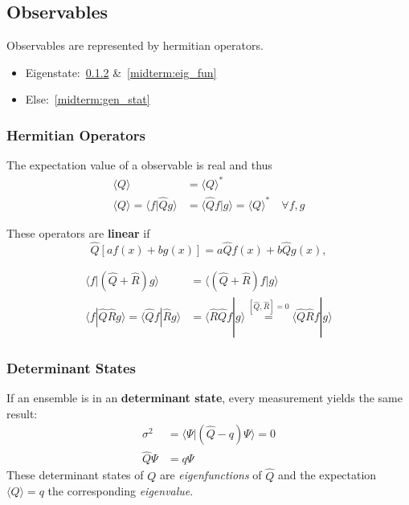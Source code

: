 \subsection{Observables}
Observables are represented by hermitian operators.
\begin{itemize}
    \item Eigenstate:\ \ref{midterm:det_states} \&\ \ref{midterm:eig_fun}
    \item Else:\ \ref{midterm:gen_stat}
\end{itemize}

\subsubsection{Hermitian Operators}
The expectation value of a observable is real and thus
\noindent\begin{align*}
    \langle Q\rangle                            & = {\langle Q\rangle}^*                                            \\
    \langle Q\rangle=\langle f|\hat{Q} g\rangle & = \langle \hat{Q}f|g\rangle={\langle Q\rangle}^*\quad \forall f,g
\end{align*}

These operators are \textbf{linear} if
\noindent\begin{equation*}
    \hat{Q}\left[af(x)+bg(x)\right]=a\hat{Q}f(x)+b\hat{Q}g(x),
\end{equation*}


\noindent\begin{align*}
    \langle f|(\hat{Q} + \hat{R})g\rangle                                    & = \langle (\hat{Q} + \hat{R})f|g\rangle                                                               \\[0.75em]
    \langle f|\hat{Q}\hat{R}g\rangle       =\langle \hat{Q}f|\hat{R}g\rangle & =  \langle \hat{R}\hat{Q}f|g\rangle \overset{[\hat{Q},\hat{R}]=0}{=} \langle \hat{Q}\hat{R}f|g\rangle
\end{align*}

\subsubsection{Determinant States}\label{midterm:det_states}
If an ensemble is in an \textbf{determinant state}, every measurement yields the same result:
\noindent\begin{align*}
    \sigma^2     & = \langle \Psi|(\hat{Q} - q) \Psi\rangle = 0 \\
    \hat{Q} \Psi & = q \Psi
\end{align*}
These determinant states of $Q$ are \textit{eigenfunctions} of $\hat{Q}$ and the expectation $\langle Q\rangle = q$ the corresponding \textit{eigenvalue}.

